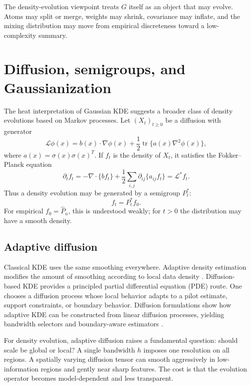\documentclass[preprint]{imsart}
\theoremstyle{plain}
\theoremstyle{definition}
\newcommand{\Emp}{\widehat P_n}
\newcommand{\calL}{\mathcal{L}}
\newcommand{\tr}{\operatorname{tr}}
\begin{document}
The density-evolution viewpoint treats $G$ itself as an object that may evolve. Atoms may split or merge, weights may shrink, covariance may inflate, and the mixing distribution may move from empirical discreteness toward a low-complexity summary.

\section{Diffusion, semigroups, and Gaussianization}
\label{sec:diffusion}

The heat interpretation of Gaussian KDE suggests a broader class of density evolutions based on Markov processes. Let $(X_t)_{t\ge0}$ be a diffusion with generator
\begin{equation*}
\calL\phi(x)=b(x)\cdot\nabla\phi(x)+\frac12\tr\{a(x)\nabla^2\phi(x)\},
\end{equation*}
where $a(x)=\sigma(x)\sigma(x)^T$. If $f_t$ is the density of $X_t$, it satisfies the Fokker--Planck equation
\begin{equation}
  \partial_t f_t
  = -\nabla\cdot\{b f_t\}+\frac12\sum_{i,j}\partial_{ij}\{a_{ij}f_t\}
  = \calL^* f_t.
  \label{eq:fokker-planck}
\end{equation}
Thus a density evolution may be generated by a semigroup $P_t^*$:
\[
  f_t=P_t^* f_0.
\]
For empirical $f_0=\Emp$, this is understood weakly; for $t>0$ the distribution may have a smooth density.

\subsection{Adaptive diffusion}
\label{subsec:adaptive-diffusion}

Classical KDE uses the same smoothing everywhere. Adaptive density estimation modifies the amount of smoothing according to local data density \citep{abramson_1982_BandwidthVariationKernel, terrell_1992_VariableKernelDensity}. Diffusion-based KDE provides a principled partial differential equation (PDE) route. One chooses a diffusion process whose local behavior adapts to a pilot estimate, support constraints, or boundary behavior. Diffusion formulations show how adaptive KDE can be constructed from linear diffusion processes, yielding bandwidth selectors and boundary-aware estimators \citep{botev_2010_KernelDensityEstimation}.


For density evolution, adaptive diffusion raises a fundamental question: should scale be global or local? A single bandwidth $h$ imposes one resolution on all regions. A spatially varying diffusion tensor can smooth aggressively in low-information regions and gently near sharp features. The cost is that the evolution operator becomes model-dependent and less transparent.
\end{document}
